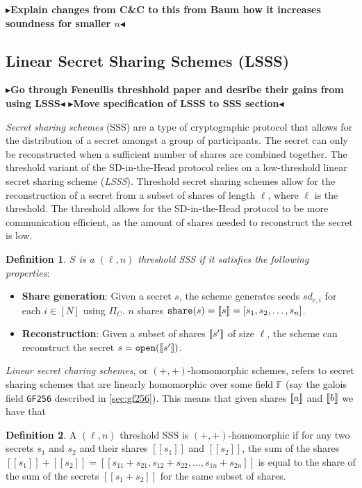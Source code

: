 \documentclass[twoside,11pt]{report}
\theoremstyle{definition}
\newtheorem{definition}{Definition}[section]
\theoremstyle{plain}
\newcommand{\todo}[1]{{\color[rgb]{.5,0,0}\textbf{$\blacktriangleright$#1$\blacktriangleleft$}}}
\begin{document}
\todo{Explain changes from C\&C to this from Baum how it increases soundness for smaller $n$}

\subsection{Linear Secret Sharing Schemes (LSSS)}\label{sec:lsss}

\todo{Go through Feneuilis threshhold paper and desribe their gains from using LSSS}
\todo{Move specification of LSSS to SSS section}

\textit{Secret sharing schemes} (SSS) are a type of cryptographic protocol that allows for the distribution of a secret amongst a group of participants. The secret can only be reconstructed when a sufficient number of shares are combined together. The threshold variant of the SD-in-the-Head protocol relies on a low-threshold linear secret sharing scheme (\textit{LSSS}). Threshold secret sharing schemes allow for the reconstruction of a secret from a subset of shares of length $\ell$, where $\ell$ is the threshold. The threshold allows for the SD-in-the-Head protocol to be more communication efficient, as the amount of shares needed to reconstruct the secret is low.

\begin{definition}\label{def:sss}
  \textit{$S$ is a $(\ell,n)$ threshold SSS if it satisfies the following properties}:

  \begin{itemize}
    \item \textbf{Share generation}: Given a secret $s$, the scheme generates seeds $sd_{e,i}$ for each $i \in [N]$ using $\Pi_C$. $n$ shares $\texttt{share}(s) = \llbracket s \rrbracket = [s_1, s_2, \dots, s_n]$.
    \item \textbf{Reconstruction}: Given a subset of shares $\llbracket s' \rrbracket$ of size $\ell$, the scheme can reconstruct the secret $s = \texttt{open}(\llbracket s' \rrbracket)$.
  \end{itemize}

\end{definition}

\textit{Linear secret charing schemes}, or $(+,+)$-homomorphic schemes, refers to secret sharing schemes that are linearly homomorphic over some field $\mathbb{F}$ (say the galois field \texttt{GF256} described in \autoref{sec:gf256}). This means that given shares $\llbracket a \rrbracket$ and $\llbracket b \rrbracket$ we have that
\begin{definition}
  A $(\ell,n)$ threshold SSS is $(+,+)$-homomorphic if for any two secrets $s_1$ and $s_2$ and their shares $[[s_1]]$ and $[[s_2]]$, the sum of the shares $[[s_1]] + [[s_2]] = [[s_{11} + s_{21}, s_{12} + s_{22}, \dots, s_{1n} + s_{2n}]]$ is equal to the share of the sum of the secrets $[[s_1 + s_2]]$ for the same subset of shares.
\end{definition}
\end{document}
